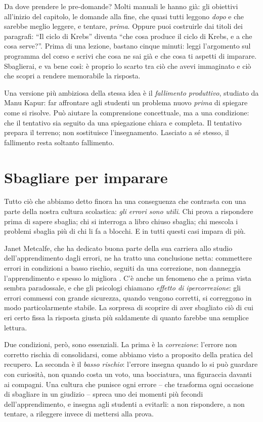 Da dove prendere le pre-domande? Molti manuali le hanno già: gli
obiettivi all'inizio del capitolo, le domande alla fine, che quasi
tutti leggono \emph{dopo} e che sarebbe meglio leggere, e tentare,
\emph{prima}. Oppure puoi costruirle dai titoli dei paragrafi:
\enquote{Il ciclo di Krebs} diventa \enquote{che cosa produce il ciclo
di Krebs, e a che cosa serve?}. Prima di una lezione, bastano cinque
minuti: leggi l'argomento sul programma del corso e scrivi che cosa ne
sai già e che cosa ti aspetti di imparare. Sbaglierai, e va bene così:
è proprio lo scarto tra ciò che avevi immaginato e ciò che scopri a
rendere memorabile la risposta.

Una versione più ambiziosa della stessa idea è il \emph{fallimento
produttivo}, studiato da Manu Kapur: far affrontare agli studenti un
problema nuovo \emph{prima} di spiegare come si risolve. Può aiutare la
comprensione concettuale, ma a una condizione: che il tentativo sia
seguito da una spiegazione chiara e completa. Il tentativo prepara il
terreno; non sostituisce l'insegnamento. Lasciato a sé stesso, il
fallimento resta soltanto fallimento.

\section{Sbagliare per imparare}

Tutto ciò che abbiamo detto finora ha una conseguenza che contrasta
con una parte della nostra cultura scolastica: \emph{gli errori sono
utili}. Chi prova a rispondere prima di sapere sbaglia; chi si
interroga a libro chiuso sbaglia; chi mescola i problemi sbaglia più
di chi li fa a blocchi. E in tutti questi casi impara di più.

Janet Metcalfe, che ha dedicato buona parte della sua carriera allo
studio dell'apprendimento dagli errori, ne ha tratto una conclusione
netta: commettere errori in condizioni a basso rischio, seguiti da una
correzione, non danneggia l'apprendimento e spesso lo migliora
\parencite{metcalfe2017}. C'è anche un fenomeno che a prima vista
sembra paradossale, e che gli psicologi chiamano \emph{effetto di
ipercorrezione}: gli errori commessi con grande sicurezza, quando
vengono corretti, si correggono in modo particolarmente stabile. La
sorpresa di scoprire di aver sbagliato ciò di cui eri certo fissa la
risposta giusta più saldamente di quanto farebbe una semplice lettura.

Due condizioni, però, sono essenziali. La prima è la
\emph{correzione}: l'errore non corretto rischia di consolidarsi, come
abbiamo visto a proposito della pratica del recupero. La seconda è il
\emph{basso rischio}: l'errore insegna quando lo si può guardare con
curiosità, non quando costa un voto, una bocciatura, una figuraccia
davanti ai compagni. Una cultura che punisce ogni errore -- che
trasforma ogni occasione di sbagliare in un giudizio -- spreca uno dei
momenti più fecondi dell'apprendimento, e insegna agli studenti a
evitarli: a non rispondere, a non tentare, a rileggere invece di
mettersi alla prova.

